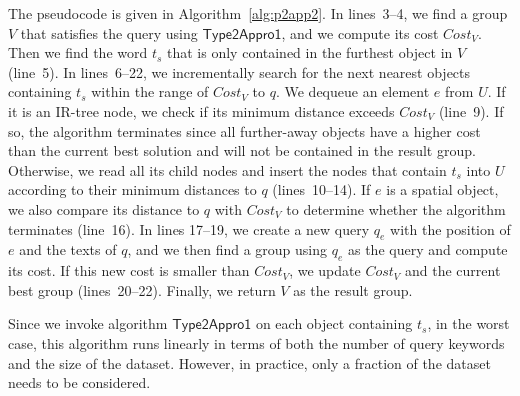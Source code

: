 \documentclass{sig-alternate}
\begin{document}
The pseudocode is given in Algorithm~\ref{alg:p2app2}. In
lines~3--4, we find a group $V$ that satisfies the query using
$\mathsf{Type2Appro1}$, and we compute its cost $Cost_V$. Then we
find the word $t_s$ that is only contained in the furthest object in
$V$ (line~5).
%
In lines~6--22, we incrementally search for the next nearest objects
containing $t_s$ within the range of $Cost_V$ to $q$. We dequeue an
element $\mathit{e}$ from $U$.
%
If it is an IR-tree node, we check if its minimum distance exceeds
$Cost_V$ (line~9). If so, the algorithm terminates since all
further-away objects have a higher cost than the current best solution
and will not be contained in the result group. Otherwise, we read
all its child nodes and insert the nodes that contain $t_s$ into $U$
according to their minimum distances to $q$ (lines~10--14).
%
If $e$ is a spatial object, we also compare its distance to $q$ with
$Cost_V$ to determine whether the algorithm terminates (line~16). In
lines 17--19, we create a new query $q_e$ with the position of
$\mathit{e}$ and the texts of $q$, and we then find a group using
$q_e$ as the query and compute its cost. If this new cost is smaller
than $Cost_V$, we update $Cost_V$ and the current best group
(lines~20--22). Finally, we return $V$ as the result group.


Since we invoke algorithm $\mathsf{Type2Appro1}$ on each object
containing $t_s$, in the worst case, this algorithm runs linearly in
terms of both the number of query keywords and the size of the
dataset. However, in practice, only a fraction of the dataset needs
to be considered.

\end{document}
